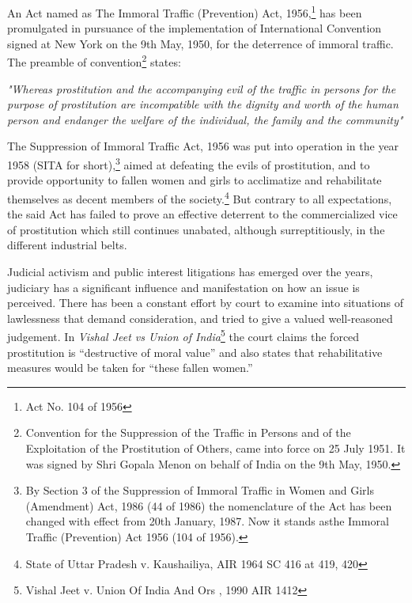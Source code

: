 \begin{multicols}{2}
\noi
An Act named as The Immoral Traffic (Prevention) Act, 1956,\footnote{Act No. 104 of 1956} has been promulgated in
pursuance of the implementation of International Convention signed at New York on the 9th
May, 1950, for the deterrence of immoral traffic. The preamble of convention\footnote{Convention for the Suppression of the Traffic in Persons and of the Exploitation of the Prostitution of Others,
came into force on 25 July 1951. It was signed by Shri Gopala Menon on behalf of India on the 9th May, 1950.} states:

\vspace{-.1cm}

\noi
\textit{"Whereas prostitution and the accompanying evil of the traffic in persons for the purpose of
prostitution are incompatible with the dignity and worth of the human person and endanger
the welfare of the individual, the family and the community"}

\vspace{-.1cm}

\noi
The Suppression of Immoral Traffic Act, 1956 was put into operation in the year 1958 (SITA
for short),\footnote{By Section 3 of the Suppression of Immoral Traffic in Women and Girls (Amendment) Act, 1986 (44 of 1986) the nomenclature of the Act has been changed with effect from 20th January, 1987. Now it stands asthe Immoral Traffic (Prevention) Act 1956 (104 of 1956).} aimed at defeating the evils of prostitution, and to provide opportunity to fallen
women and girls to acclimatize and rehabilitate themselves as decent members of the society.\footnote{State of Uttar Pradesh v. Kaushailiya, AIR 1964 SC 416 at 419, 420} But contrary to all expectations, the said Act has failed to prove an effective deterrent to the commercialized vice of prostitution which still continues unabated, although surreptitiously, in the different industrial belts.

\vspace{-.15cm}

\noi
Judicial activism and public interest litigations has emerged over the years, judiciary has a
significant influence and manifestation on how an issue is perceived. There has been a constant
effort by court to examine into situations of lawlessness that demand consideration, and tried to give a valued well-reasoned judgement. In \textit{Vishal Jeet vs Union of India}\footnote{Vishal Jeet v. Union Of India And Ors , 1990 AIR 1412} the court claims the forced prostitution is “destructive of moral value” and also states that rehabilitative measures would be taken for “these fallen women.”


\end{multicols}
